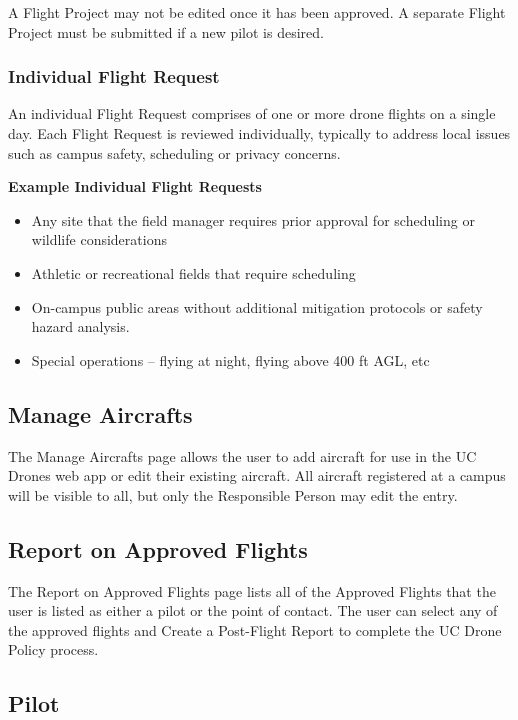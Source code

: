 \documentclass[
  12pt,
]{book}
\providecommand{\tightlist}{%
  \setlength{\itemsep}{0pt}\setlength{\parskip}{0pt}}
\begin{document}
A Flight Project may not be edited once it has been approved. A separate Flight Project must be submitted if a new pilot is desired.

\subsubsection{Individual Flight Request}\label{individual-flight-request}

An individual Flight Request comprises of one or more drone flights on a single day. Each Flight Request is reviewed individually, typically to address local issues such as campus safety, scheduling or privacy concerns.

\textbf{Example Individual Flight Requests}

\begin{itemize}
\tightlist
\item
  Any site that the field manager requires prior approval for scheduling or wildlife considerations
\item
  Athletic or recreational fields that require scheduling
\item
  On-campus public areas without additional mitigation protocols or safety hazard analysis.
\item
  Special operations -- flying at night, flying above 400 ft AGL, etc
\end{itemize}

\subsection{Manage Aircrafts}\label{manage-aircrafts}

The Manage Aircrafts page allows the user to add aircraft for use in the UC Drones web app or edit their existing aircraft. All aircraft registered at a campus will be visible to all, but only the Responsible Person may edit the entry.

\subsection{Report on Approved Flights}\label{report-on-approved-flights}

The Report on Approved Flights page lists all of the Approved Flights that the user is listed as either a pilot or the point of contact. The user can select any of the approved flights and Create a Post-Flight Report to complete the UC Drone Policy process.

\subsection{Pilot}\label{UCDrones-pilot}
\end{document}
